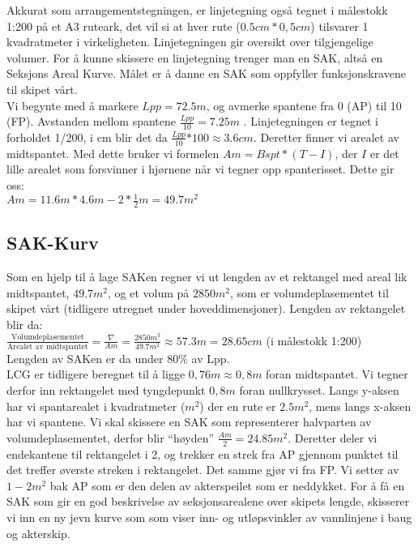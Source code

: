 \documentclass[norsk]{article}
\begin{document}
Akkurat som arrangementstegningen, er linjetegning også tegnet i målestokk 1:200 på et A3 ruteark, det vil si at hver rute ($0.5cm * 0,5 cm$) tilsvarer 1 kvadratmeter i virkeligheten. Linjetegningen gir oversikt over tilgjengelige volumer. For å kunne skissere en linjetegning trenger man en SAK, altså en Seksjons Areal Kurve. Målet er å danne en SAK som oppfyller funksjonskravene til skipet vårt. \\

Vi begynte med å markere $Lpp=72.5m$, og avmerke spantene fra 0 (AP) til 10 (FP). Avstanden mellom spantene \(\frac{Lpp}{10}\)$=7.25m$ . Linjetegningen er tegnet i forholdet 1/200, i cm blir det da \(\frac{Lpp}{10}\)$*100\approx 3.6 cm$.  Deretter finner vi arealet av midtspantet. Med dette bruker vi formelen $Am= Bspt*(T-I)$, der $I$ er det lille arealet som forsvinner i hjørnene når vi tegner opp spanterisset. Dette gir oss: \\

$Am=11.6m*4.6m - 2*$\(\frac{1}{2}\)$m=49.7m^2$ \\

	\subsection{SAK-Kurv}
Som en hjelp til å lage SAKen regner vi ut lengden av et rektangel med areal lik midtspantet, $49.7 m^2$, og et volum på $2850 m^2$, som er volumdeplasementet til skipet vårt (tidligere utregnet under hoveddimensjoner).  Lengden av rektangelet blir da: \\

\(\frac{\text{Volumdeplasementet}}{\text{Arealet av midtspantet}}\)$=$\(\frac{\nabla}{Am}\)$=$\(\frac{2850m^3}{49.7m^2}\)$\approx 57.3m=28.65cm$ (i målestokk 1:200) \\

Lengden av SAKen er da under $80\%$ av Lpp. \\

LCG er tidligere beregnet til å ligge $0,76m\approx0,8m$ foran midtspantet. Vi tegner derfor inn rektangelet med tyngdepunkt $0,8m$ foran nullkrysset. Langs y-aksen har vi spantarealet i kvadratmeter ($m^2$) der en rute er $2.5 m^2$, mens langs x-aksen har vi spantene. Vi skal skissere en SAK som representerer halvparten av volumdeplasementet, derfor blir “høyden” \(\frac{Am}{2}\)$= 24.85 m^2$. Deretter deler vi endekantene til rektangelet i 2, og trekker en strek fra AP gjennom punktet til det treffer øverste streken i rektangelet. Det samme gjør vi fra FP. Vi setter av $1 - 2m^2$ bak AP som er den delen av akterspeilet som er neddykket. For å få en SAK som gir en god beskrivelse av seksjonsarealene over skipets lengde, skisserer vi inn en ny jevn kurve som som viser inn- og utløpsvinkler av vannlinjene i baug og akterskip. \\
\end{document}
